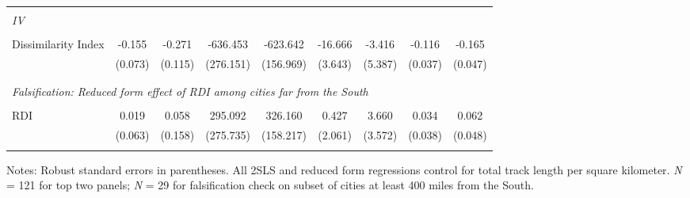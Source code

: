 \begin{table}[H]
{\begin{threeparttable}
\begin{tabular}{lcccccccc}
\smallskip \\
 \multicolumn{8}{l}{\emph{IV}} & \\
\smallskip \\
Dissimilarity Index &      -0.155\sym{**} &      -0.271\sym{**} &    -636.453\sym{**} &    -623.642\sym{***}&     -16.666\sym{***}&      -3.416         &      -0.116\sym{***}&      -0.165\sym{***}\\
                    &     (0.073)         &     (0.115)         &   (276.151)         &   (156.969)         &     (3.643)         &     (5.387)         &     (0.037)         &     (0.047)         \\
\smallskip \\
\smallskip \\
 \multicolumn{8}{l}{\emph{Falsification: Reduced form effect of RDI among cities far from the South}} & \\
\smallskip \\
RDI                 &       0.019         &       0.058         &     295.092         &     326.160\sym{**} &       0.427         &       3.660         &       0.034         &       0.062         \\
                    &     (0.063)         &     (0.158)         &   (275.735)         &   (158.217)         &     (2.061)         &     (3.572)         &     (0.038)         &     (0.048)         \\
\bottomrule[0.5pt]                                                                               \label{tab:table2}                                                                       \end{tabular}                                                                                                    \vspace{-13pt}                                                                                           \begin{tablenotes}[flushleft]{\setlength{\itemindent}{-3pt}}          \small                                                                                                           \item Notes: Robust standard errors in parentheses. All 2SLS and reduced form regressions control for total track length per square kilometer. \textit{N} = 121 for top two panels; \textit{N} = 29 for falsification check on subset of cities at least 400 miles from the South.           \end{tablenotes}                                                                                         \end{threeparttable}                                                                             }                                                                                                                        \end{table}
